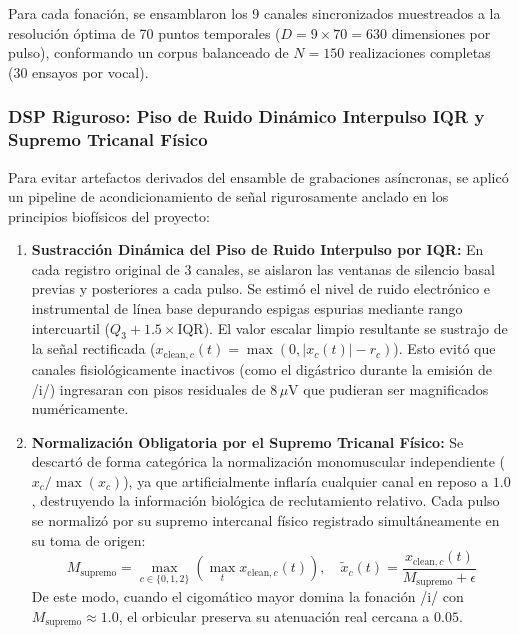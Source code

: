 \documentclass[11pt,a4paper,openany]{book}
\theoremstyle{definition}
\begin{document}
Para cada fonación, se ensamblaron los 9 canales sincronizados muestreados a la resolución óptima de 70 puntos temporales ($D = 9 \times 70 = 630$ dimensiones por pulso), conformando un corpus balanceado de $N = 150$ realizaciones completas (30 ensayos por vocal).

\subsubsection{DSP Riguroso: Piso de Ruido Dinámico Interpulso IQR y Supremo Tricanal Físico}
\label{subsubsec:dsp_riguroso_pseudo_hd}

Para evitar artefactos derivados del ensamble de grabaciones asíncronas, se aplicó un pipeline de acondicionamiento de señal rigurosamente anclado en los principios biofísicos del proyecto:
\begin{enumerate}
    \item \textbf{Sustracción Dinámica del Piso de Ruido Interpulso por IQR:} En cada registro original de 3 canales, se aislaron las ventanas de silencio basal previas y posteriores a cada pulso. Se estimó el nivel de ruido electrónico e instrumental de línea base depurando espigas espurias mediante rango intercuartil ($Q_3 + 1.5 \times \text{IQR}$). El valor escalar limpio resultante se sustrajo de la señal rectificada ($x_{\text{clean}, c}(t) = \max(0, |x_c(t)| - r_c)$). Esto evitó que canales fisiológicamente inactivos (como el digástrico durante la emisión de /i/) ingresaran con pisos residuales de $8\,\mu\text{V}$ que pudieran ser magnificados numéricamente.
    \item \textbf{Normalización Obligatoria por el Supremo Tricanal Físico:} Se descartó de forma categórica la normalización monomuscular independiente ($x_c / \max(x_c)$), ya que artificialmente inflaría cualquier canal en reposo a $1.0$, destruyendo la información biológica de reclutamiento relativo. Cada pulso se normalizó por su supremo intercanal físico registrado simultáneamente en su toma de origen:
    \begin{equation}
        M_{\text{supremo}} = \max_{c \in \{0, 1, 2\}} \left( \max_t x_{\text{clean}, c}(t) \right), \quad \tilde{x}_c(t) = \frac{x_{\text{clean}, c}(t)}{M_{\text{supremo}} + \epsilon}
    \end{equation}
    De este modo, cuando el cigomático mayor domina la fonación /i/ con $M_{\text{supremo}} \approx 1.0$, el orbicular preserva su atenuación real cercana a $0.05$.
\end{enumerate}
\end{document}
